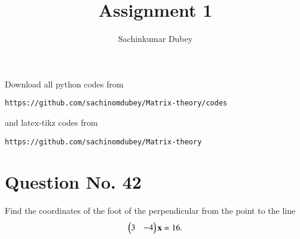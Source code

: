 \documentclass[journal,12pt,twocolumn]{IEEEtran}
\begin{document}
\renewcommand{\thefigure}{\theproblem}

\def\putbox#1#2#3{\makebox[0in][l]{\makebox[#1][l]{}\raisebox{\baselineskip}[0in][0in]{\raisebox{#2}[0in][0in]{#3}}}}
     \def\rightbox#1{\makebox[0in][r]{#1}}
     \def\centbox#1{\makebox[0in]{#1}}
     \def\topbox#1{\raisebox{-\baselineskip}[0in][0in]{#1}}
     \def\midbox#1{\raisebox{-0.5\baselineskip}[0in][0in]{#1}}
\vspace{3cm}
\title{Assignment 1}
\author{Sachinkumar Dubey}

\maketitle
\newpage

\bigskip
\renewcommand{\thefigure}{\theenumi}
\renewcommand{\thetable}{\theenumi}
Download all python codes from 
\begin{lstlisting}
https://github.com/sachinomdubey/Matrix-theory/codes
\end{lstlisting}
%
and latex-tikz codes from 
%
\begin{lstlisting}
https://github.com/sachinomdubey/Matrix-theory
\end{lstlisting}
%
\section{Question No. 42}
\item Find the coordinates of the foot of the perpendicular from the point  to the line
%
\begin{align}
\begin{pmatrix}3 & -4\end{pmatrix}\mathbf{x} = 16.
\end{align}
%
\end{document}
